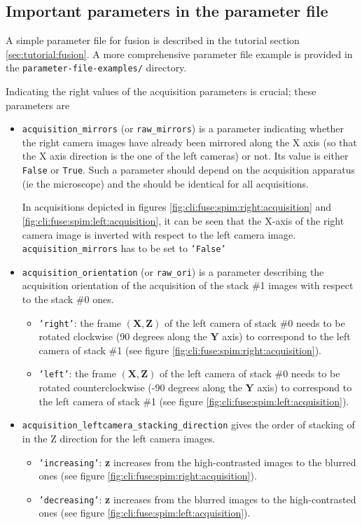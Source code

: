 \subsection{Important parameters in the parameter file}
\label{sec:cli:fuse:important:parameters}

A simple parameter file for fusion is described in the tutorial
section \ref{sec:tutorial:fusion}. A more comprehensive parameter file
example is provided in the \texttt{parameter-file-examples/} directory.

Indicating the right values of the
acquisition parameters is crucial; these parameters are
\begin{itemize}
\itemsep -0.5ex
\item \texttt{acquisition\_mirrors}  (or \texttt{raw\_mirrors}) is a parameter indicating whether the right camera images have already been mirrored along the X axis (so that the X axis direction is the one of the left cameras) or not. Its value is either \texttt{False} or \texttt{True}. Such a parameter should depend on the acquisition apparatus (ie the microscope) and the should be identical for all acquisitions.

In acquisitions depicted in figures \ref{fig:cli:fuse:spim:right:acquisition} and \ref{fig:cli:fuse:spim:left:acquisition}, it can be seen that the X-axis of the right camera image is inverted with respect to the left camera image. \texttt{acquisition\_mirrors} has to be set to \texttt{'False'}
  
  
\item \texttt{acquisition\_orientation} (or \texttt{raw\_ori}) is a parameter describing the acquisition orientation of the acquisition of the stack \#1 images with respect to the stack \#0 ones. 

\begin{itemize}
\item \texttt{'right'}: the frame $(\mathbf{X}, \mathbf{Z})$ of the left camera of stack \#0 needs to be rotated clockwise (90 degrees along the $\mathbf{Y}$ axis) to correspond to the left camera of stack \#1 (see figure \ref{fig:cli:fuse:spim:right:acquisition}).
\item \texttt{'left'}: the frame $(\mathbf{X}, \mathbf{Z})$ of the left camera of stack \#0 needs to be rotated counterclockwise (-90 degrees along the $\mathbf{Y}$ axis) to correspond to the left camera of stack \#1 (see figure \ref{fig:cli:fuse:spim:left:acquisition}).
\end{itemize}

\item \texttt{acquisition\_leftcamera\_stacking\_direction} gives the order of stacking of in the Z direction for the left camera images.
\begin{itemize}
\item \texttt{'increasing'}: \textbf{z} increases from the high-contrasted images to the blurred ones (see figure \ref{fig:cli:fuse:spim:right:acquisition}).
\item \texttt{'decreasing'}: \textbf{z} increases from the blurred images to the high-contrasted ones (see figure \ref{fig:cli:fuse:spim:left:acquisition}).
\end{itemize}


\end{itemize}
